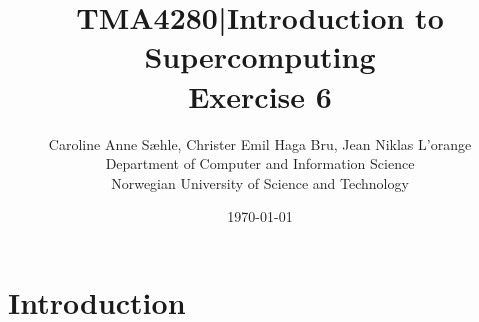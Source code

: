 \documentclass[a4paper,10pt]{article}
\title{TMA4280|Introduction to Supercomputing\\
  Exercise 6}
\author{Caroline Anne Sæhle, Christer Emil Haga Bru, Jean Niklas L'orange\\
Department of Computer and Information Science\\
Norwegian University of Science and Technology
}
\date{\today}
\begin{document}
\maketitle
\thispagestyle{empty}
\addtocounter{page}{-1}
\newpage

\section{Introduction}
\end{document}
